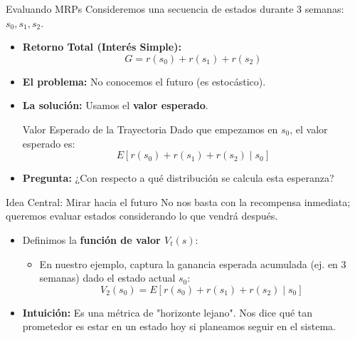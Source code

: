 \documentclass[xcolor=dvipsnames]{beamer}
\begin{document}
\begin{frame}{Evaluando MRPs}
Consideremos una secuencia de estados durante 3 semanas: $s_0, s_1, s_2$.

\begin{itemize}
    \item \textbf{Retorno Total (Interés Simple):}
    \[ G = r(s_0) + r(s_1) + r(s_2) \]

    \item<2-> \textbf{El problema:} No conocemos el futuro (es estocástico).
    \item<3-> \textbf{La solución:} Usamos el \textbf{valor esperado}.
    
    \begin{alertblock}{Valor Esperado de la Trayectoria}
        Dado que empezamos en $s_0$, el valor esperado es:
        \[ E[r(s_0) + r(s_1) + r(s_2) \mid s_0] \]
    \end{alertblock}
    
    \item<4-> \textbf{Pregunta:} ¿Con respecto a qué distribución se calcula esta esperanza?
\end{itemize}
\end{frame}

\begin{frame}{Idea Central: Mirar hacia el futuro}
No nos basta con la recompensa inmediata; queremos evaluar estados considerando lo que vendrá después.

\begin{itemize}
    \item<2-> Definimos la \textbf{función de valor $V_t(s)$}:
    \begin{itemize}
        \item En nuestro ejemplo, captura la ganancia esperada acumulada (ej. en 3 semanas) dado el estado actual $s_0$:
        \[ V_2(s_0) = E\left[ r(s_0) + r(s_1) + r(s_2) \mid s_0 \right] \]
    \end{itemize}
    \item<3-> \textbf{Intuición:} Es una métrica de "horizonte lejano". Nos dice qué tan prometedor es estar en un estado hoy si planeamos seguir en el sistema.
\end{itemize}
\end{frame}
\end{document}
